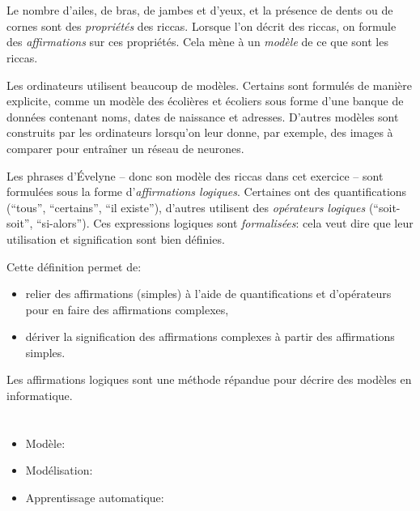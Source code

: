 {{%
\section*{\BrochureItsInformatics}
Le nombre d’ailes, de bras, de jambes et d’yeux, et la présence de dents ou de cornes sont des \emph{propriétés} des riccas. Lorsque l’on décrit des riccas, on formule des \emph{affirmations} sur ces propriétés. Cela mène à un \emph{modèle} de ce que sont les riccas.

Les ordinateurs utilisent beaucoup de modèles. Certains sont formulés de manière explicite, comme un modèle des écolières et écoliers sous forme d’une banque de données contenant noms, dates de naissance et adresses. D’autres modèles sont construits par les ordinateurs lorsqu’on leur donne, par exemple, des images à comparer pour entraîner un réseau de neurones.

Les phrases d’Évelyne – donc son modèle des riccas dans cet exercice – sont formulées sous la forme d’\emph{affirmations logiques}. Certaines ont des quantifications (“tous”, “certains”, “il existe”), d’autres utilisent des \emph{opérateurs logiques} (“soit-soit”, “si-alors”). Ces expressions logiques sont \emph{formalisées}: cela veut dire que leur utilisation et signification sont bien définies.

\begin{samepage}
Cette définition permet de:

\nopagebreak

\begin{itemize}
  \item relier des affirmations (simples) à l’aide de quantifications et d’opérateurs pour en faire des affirmations complexes,
  \item dériver la signification des affirmations complexes à partir des affirmations simples.
\end{itemize}


\end{samepage}

Les affirmations logiques sont une méthode répandue pour décrire des modèles en informatique.



\section*{\BrochureWebsitesAndKeywords}
{\raggedright
\begin{itemize}
  \item Modèle: \href{https://fr.wikipedia.org/wiki/Mod\%C3\%A8le}{}
  \item Modélisation: \href{https://fr.wikipedia.org/wiki/Mod\%C3\%A9lisation}{}
  \item Apprentissage automatique: \href{https://fr.wikipedia.org/wiki/Apprentissage_automatique}{}
\end{itemize}


}}}
